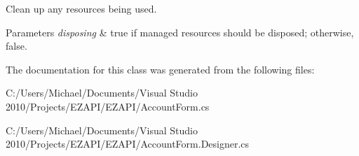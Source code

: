 Clean up any resources being used. 


\begin{DoxyParams}{Parameters}
{\em disposing} & true if managed resources should be disposed; otherwise, false.\\
\hline
\end{DoxyParams}


The documentation for this class was generated from the following files\-:\begin{DoxyCompactItemize}
\item 
C\-:/\-Users/\-Michael/\-Documents/\-Visual Studio 2010/\-Projects/\-E\-Z\-A\-P\-I/\-E\-Z\-A\-P\-I/Account\-Form.\-cs\item 
C\-:/\-Users/\-Michael/\-Documents/\-Visual Studio 2010/\-Projects/\-E\-Z\-A\-P\-I/\-E\-Z\-A\-P\-I/Account\-Form.\-Designer.\-cs\end{DoxyCompactItemize}
